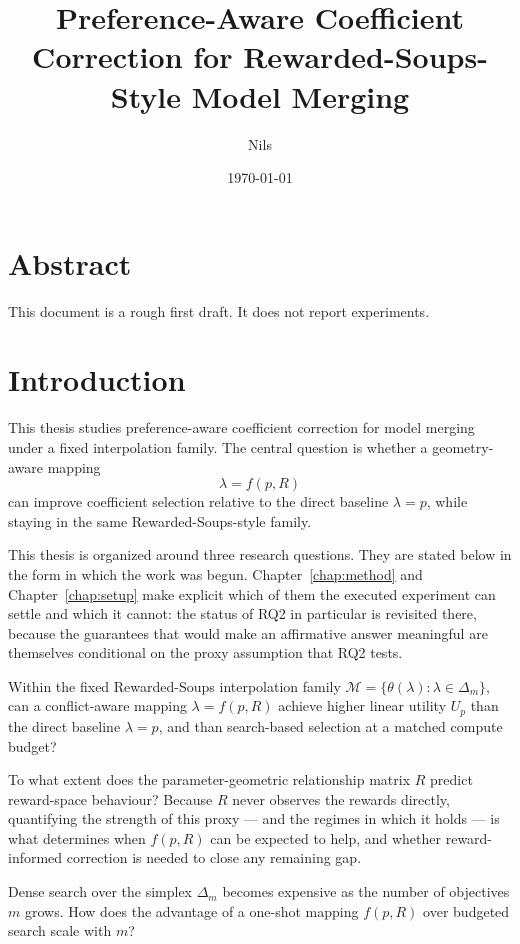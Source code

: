 \documentclass[12pt,a4paper]{report}
\title{Preference-Aware Coefficient Correction for Rewarded-Soups-Style Model Merging}
\author{Nils}
\date{\today}
\newcommand{\1}{\mathbf{1}}
\newcommand{\Mfam}{\mathcal{M}}
\theoremstyle{definition}
\begin{document}
\maketitle
\tableofcontents

\chapter*{Abstract}
This document is a rough first draft. It does not report experiments.

\chapter{Introduction}

This thesis studies preference-aware coefficient correction for model merging under a fixed interpolation family. The central question is whether a geometry-aware mapping
\[
\lambda=f(p,R)
\]
can improve coefficient selection relative to the direct baseline \(\lambda=p\), while staying in the same Rewarded-Soups-style family.

This thesis is organized around three research questions. They are stated below in the form in which the work was begun. Chapter~\ref{chap:method} and Chapter~\ref{chap:setup} make explicit which of them the executed experiment can settle and which it cannot: the status of RQ2 in particular is revisited there, because the guarantees that would make an affirmative answer meaningful are themselves conditional on the proxy assumption that RQ2 tests.

\begin{description}[leftmargin=2.2em,style=nextline]
\item[\textbf{RQ1 (Does geometry-aware correction help?)}]
Within the fixed Rewarded-Soups interpolation family \(\Mfam=\{\theta(\lambda):\lambda\in\Delta_m\}\), can a conflict-aware mapping \(\lambda=f(p,R)\) achieve higher linear utility \(U_p\) than the direct baseline \(\lambda=p\), and than search-based selection at a matched compute budget?
\item[\textbf{RQ2 (Is \(R\) a valid proxy, and when does it help?)}]
To what extent does the parameter-geometric relationship matrix \(R\) predict reward-space behaviour? Because \(R\) never observes the rewards directly, quantifying the strength of this proxy --- and the regimes in which it holds --- is what determines when \(f(p,R)\) can be expected to help, and whether reward-informed correction is needed to close any remaining gap.
\item[\textbf{RQ3 (How does the benefit scale with \(m\)?)}]
Dense search over the simplex \(\Delta_m\) becomes expensive as the number of objectives \(m\) grows. How does the advantage of a one-shot mapping \(f(p,R)\) over budgeted search scale with \(m\)?
\end{description}
\end{document}
